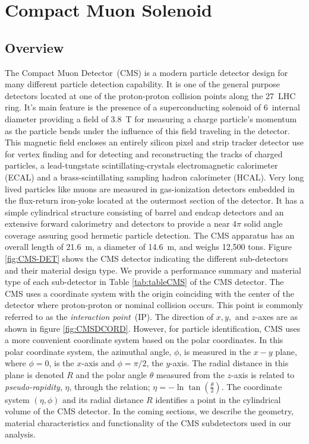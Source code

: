 \clearpage

\section{Compact Muon Solenoid}
\subsection{Overview}
The Compact Muon Detector~(CMS) is a modern particle detector design for many different particle detection capability.
It is one of the general purpose detectors located at one of the proton-proton collision points along the 27~\km LHC ring.
It's main feature is the presence of a superconducting solenoid of 6~\m internal diameter providing a field of 3.8~T for measuring a charge particle's momentum as the particle bends under the influence of this field traveling in the detector.
This magnetic field  encloses an entirely silicon pixel and strip tracker detector use for vertex finding and for detecting and reconstructing the tracks of charged particles, a lead-tungstate scintillating-crystals electromagnetic calorimeter (ECAL) and a brass-scintillating sampling hadron calorimeter (HCAL). Very long lived particles like muons are measured in gas-ionization detectors embedded in the flux-return iron-yoke located at the outermost section of the detector.
It has a simple cylindrical structure consisting of barrel and endcap detectors and an extensive forward calorimetry and detectors to provide a near $4\pi$ solid angle coverage assuring good hermetic particle detection. The CMS apparatus has an overall length of 21.6~m, a diameter of 14.6~m, and weighs 12,500 tons. Figure \ref{fig:CMS-DET} shows the CMS detector indicating the different sub-detectors and their 
material design type. We provide a performance summary and  material type of each sub-detector in Table \ref{tab:tableCMS} of the CMS detector.
The CMS uses a coordinate system with the origin coinciding with the center of the detector where proton-proton or nominal collision 
occurs. This point is commonly referred to as the \textit{interaction point}~(IP). The direction of $x,y,$ and $z$-axes are as shown in figure \ref{fig:CMSDCORD}. However, for particle identification, CMS uses a more convenient coordinate system based on the polar coordinates. In this polar coordinate system, the azimuthal angle, $\phi$, is measured in the $x-y$ plane, where $\phi = 0$, is the $x$-axis and $\phi = \pi/2 $, the $y$-axis. The radial distance in this plane is denoted $R$ and the polar angle $\theta$  measured from the $z$-axis is related to \textit{pseudo-rapidity}, $\eta$, through the relation; $\eta = -\ln \tan(\frac{\theta} {2}) $. 
The coordinate system $(\eta, \phi)$ and its radial distance $R$ identifies a point in the cylindrical volume of the CMS detector. 
In the coming sections, we describe the geometry, material characteristics and functionality of the CMS subdetectors  used in our analysis.

